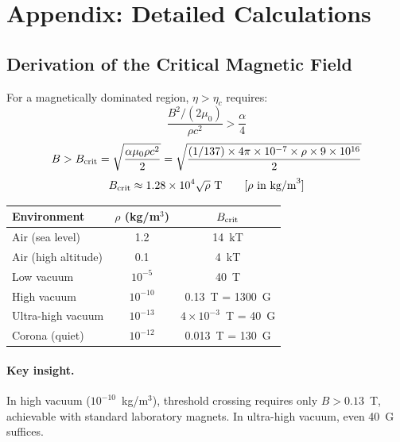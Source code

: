\documentclass[12pt,a4paper]{article}
\begin{document}
\section{Appendix: Detailed Calculations}
\label{sec:appendix}

\subsection{Derivation of the Critical Magnetic Field}

For a magnetically dominated region, $\eta > \eta_c$ requires:
\begin{equation}
\frac{B^2/(2\mu_0)}{\rho c^2} > \frac{\alpha}{4}
\end{equation}
\begin{equation}
B > B_{\rm crit} = \sqrt{\frac{\alpha \mu_0 \rho c^2}{2}}
= \sqrt{\frac{(1/137) \times 4\pi \times 10^{-7} \times \rho \times 9 \times 10^{16}}{2}}
\end{equation}
\begin{equation}
B_{\rm crit} \approx 1.28 \times 10^4 \sqrt{\rho}~\text{T}
\qquad [\rho \text{ in kg/m}^3]
\end{equation}

\begin{center}
\begin{tabular}{lcc}
\toprule
Environment & $\rho$ (kg/m$^3$) & $B_{\rm crit}$ \\
\midrule
Air (sea level) & 1.2 & 14~kT \\
Air (high altitude) & 0.1 & 4~kT \\
Low vacuum & $10^{-5}$ & 40~T \\
High vacuum & $10^{-10}$ & 0.13~T = 1300~G \\
Ultra-high vacuum & $10^{-13}$ & $4 \times 10^{-3}$~T = 40~G \\
Corona (quiet) & $10^{-12}$ & 0.013~T = 130~G \\
\bottomrule
\end{tabular}
\end{center}

\paragraph{Key insight.}
In high vacuum ($10^{-10}$~kg/m$^3$), threshold crossing requires only
$B > 0.13$~T, achievable with standard laboratory magnets.  In ultra-high
vacuum, even 40~G suffices.
\end{document}
